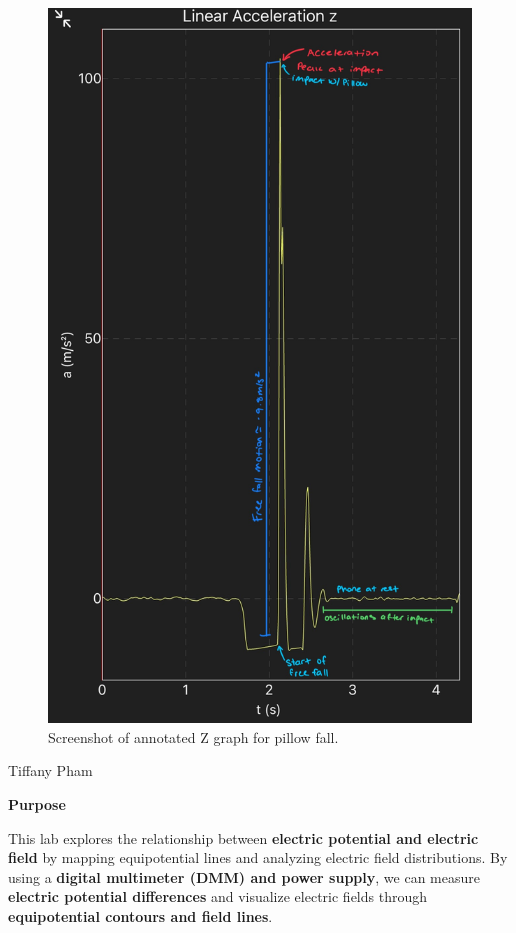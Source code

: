 \documentclass[idxtotoc,hyperref,openany]{labbook} %
\begin{document}
\begin{figure}[H] %
\begin{center}
\includegraphics[width=.80\linewidth]{images/Lab.04/Lab04Z.jpg}
\end{center}
\caption{Screenshot of annotated Z graph for pillow fall.}
\label{fig:Lab04-AnnotatedZGraph}
\end{figure}


\vspace{-5mm}
\vspace{-5mm}
Tiffany Pham

\textbf{Purpose}

This lab explores the relationship between \textbf{electric potential and electric field} by mapping equipotential lines and analyzing electric field distributions. By using a \textbf{digital multimeter (DMM) and power supply}, we can measure \textbf{electric potential differences} and visualize electric fields through \textbf{equipotential contours and field lines}.
\end{document}
